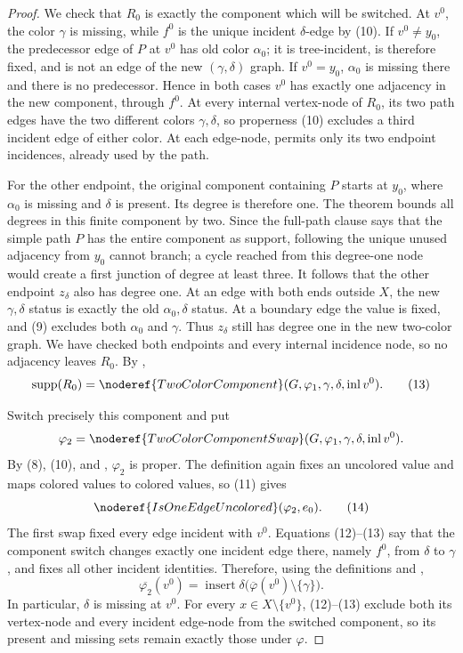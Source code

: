 \begin{proof}
We check that $R_0$ is exactly the component which will be switched.  At
$v^0$, the color $\gamma$ is missing, while $f^0$ is the unique incident
$\delta$-edge by (10).  If $v^0\ne y_0$, the predecessor edge of $P$ at
$v^0$ has old color $\alpha _0$; it is tree-incident, is therefore fixed,
and is not an edge of the new $(\gamma,\delta)$ graph.  If $v^0=y_0$,
$\alpha _0$ is missing there and there is no predecessor.  Hence in both
cases $v^0$ has exactly one adjacency in the new component, through
$f^0$.  At every internal vertex-node of $R_0$, its two path edges have
the two different colors $\gamma,\delta$, so properness (10) excludes a
third incident edge of either color.  At each edge-node,
 permits only its two endpoint
incidences, already used by the path.

For the other endpoint, the original component containing $P$ starts at
$y_0$, where $\alpha _0$ is missing and $\delta$ is present.  Its degree
is therefore one.  The theorem
 bounds all degrees in this
finite component by two.  Since the full-path clause says that the simple
path $P$ has the entire component as support, following the unique unused
adjacency from $y_0$ cannot branch; a cycle reached from this degree-one
node would create a first junction of degree at least three.  It follows
that the other endpoint $z_\delta$ also has degree one.  At an edge with
both ends outside $X$, the new $\gamma,\delta$ status is exactly the old
$\alpha _0,\delta$ status.  At a boundary edge the value is fixed, and
(9) excludes both $\alpha _0$ and $\gamma$.  Thus $z_\delta$ still has
degree one in the new two-color graph.  We have checked both endpoints
and every internal incidence node, so no adjacency leaves $R_0$.  By
,
\[
 \operatorname{supp}(R_0)=
 \noderef{TwoColorComponent}
   (G,\varphi_1,\gamma,\delta,\operatorname{inl}v^0).         \tag{13}
\]

Switch precisely this component and put
\[
 \varphi_2=\noderef{TwoColorComponentSwap}
   (G,\varphi_1,\gamma,\delta,\operatorname{inl}v^0).
\]
By (8), (10), and , $\varphi_2$ is
proper.  The definition  again fixes an
uncolored value and maps colored values to colored values, so (11) gives
\[
 \noderef{IsOneEdgeUncolored}(\varphi_2,e_0).                 \tag{14}
\]
The first swap fixed every edge incident with $v^0$.  Equations
(12)--(13) say that the component switch changes exactly one incident
edge there, namely $f^0$, from $\delta$ to $\gamma$, and fixes all other
incident identities.  Therefore, using the definitions
 and ,
\[
 \overline{\varphi_2}(v^0)
 =\operatorname{insert}\delta
   \bigl(\overline\varphi(v^0)\setminus\{\gamma\}\bigr).     \tag{15}
\]
In particular, $\delta$ is missing at $v^0$.  For every
$x\in X\setminus\{v^0\}$, (12)--(13) exclude both its vertex-node and
every incident edge-node from the switched component, so its present and
missing sets remain exactly those under $\varphi$.


\end{proof}
